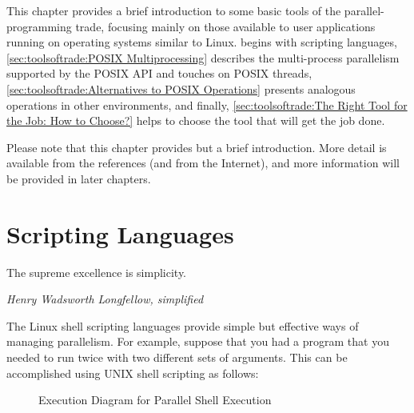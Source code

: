 
%

This chapter provides a brief introduction to some basic tools of the
parallel-programming trade, focusing mainly on those available to
user applications running on operating systems similar to Linux.
 begins with
scripting languages,
\cref{sec:toolsoftrade:POSIX Multiprocessing}
describes the multi-process parallelism supported by the POSIX API and
touches on POSIX threads,
\cref{sec:toolsoftrade:Alternatives to POSIX Operations}
presents analogous operations in other environments, and finally,
\cref{sec:toolsoftrade:The Right Tool for the Job: How to Choose?}
helps to choose the tool that will get the job done.

\QuickQuizEnd

Please note that this chapter provides but a brief introduction.
More detail is available from the references (and from the Internet),
and more information will be provided in later chapters.

\section{Scripting Languages}
\label{sec:toolsoftrade:Scripting Languages}
%
\epigraph{The supreme excellence is simplicity.}
	 {\emph{Henry Wadsworth Longfellow, simplified}}

The Linux shell scripting languages provide simple but effective ways
of managing parallelism.
For example, suppose that you had a program 
that you needed to run twice with two different sets of arguments.
This can be accomplished using UNIX shell scripting as follows:



\begin{figure}
\centering
{}
\caption{Execution Diagram for Parallel Shell Execution}
\label{fig:toolsoftrade:Execution Diagram for Parallel Shell Execution}
\end{figure}

